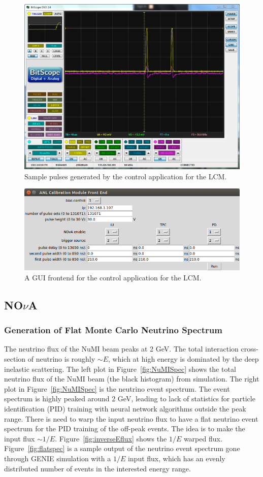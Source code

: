 \documentclass[12pt,a4paper,final]{iopart}
\begin{document}
\begin{figure}
  \centering
  \includegraphics[width=.7\textwidth]{figures/2015/pulser.jpg}
  \caption{Sample pulses generated by the control application for the LCM.}
  \label{fig:pulser_pulse}
\end{figure}

\begin{figure}
  \centering
  \includegraphics[width=.7\textwidth]{figures/2015/Screenshot_from_2015-09-23_10-49-58.png}
  \caption{A GUI frontend for the control application for the LCM.}
  \label{fig:pulser_frontend}
\end{figure}

\subsection[NOvA]{NO$\nu$A}

\subsubsection{Generation of Flat Monte Carlo Neutrino Spectrum}

The neutrino flux of the NuMI beam peaks at 2 GeV. The total interaction cross-section of neutrino is roughly $\sim E$, which at high energy is dominated by the deep inelastic scattering. The left plot in Figure~\ref{fig:NuMISpec} shows the total neutrino flux of the NuMI beam (the black histogram) from simulation. The right plot in Figure~\ref{fig:NuMISpec} is the neutrino event spectrum. The event spectrum is highly peaked around 2 GeV, leading to lack of statistics for particle identification (PID) training with neural network algorithms outside the peak range. There is need to warp the input neutrino flux to have a flat neutrino event spectrum for the PID training of the off-peak events. The idea is to make the input flux $\sim1/E$. Figure~\ref{fig:inverseEflux} shows the $1/E$ warped flux. Figure~\ref{fig:flatspec} is a sample output of the neutrino event spectrum gone through GENIE simulation with a $1/E$ input flux, which has an evenly distributed number of events in the interested energy range.
\end{document}
